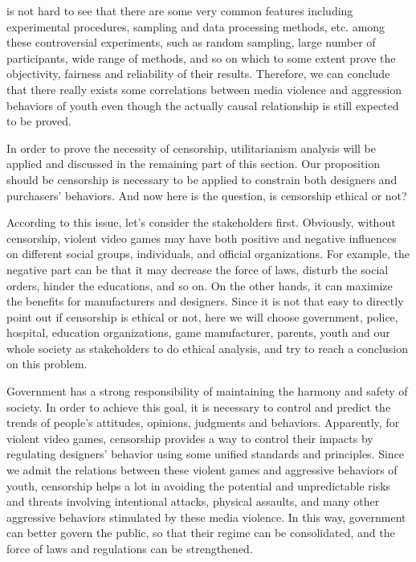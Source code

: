 is not hard to see that there are some very common features including experimental procedures, sampling and data processing methods, etc. among these controversial experiments, such as random sampling, large number of participants, wide range of methods, and so on which to some extent prove the objectivity, fairness and reliability of their results. Therefore, we can conclude that there really exists some correlations between media violence and aggression behaviors of youth even though the actually causal relationship is still expected to be proved. 

In order to prove the necessity of censorship, utilitarianism analysis will be applied and discussed in the remaining part of this section. Our proposition should be censorship is necessary to be applied to constrain both designers and purchasers' behaviors. And now here is the question, is censorship ethical or not? 

According to this issue, let's consider the stakeholders first. Obviously, without censorship, violent video games may have both positive and negative influences on different social groups, individuals, and official organizations. For example, the negative part can be that it may decrease the force of laws, disturb the social orders, hinder the educations, and so on. On the other hands, it can maximize the benefits for manufacturers and designers. Since it is not that easy to directly point out if censorship is ethical or not, here we will choose government, police, hospital, education organizations, game manufacturer, parents, youth and our whole society as stakeholders to do ethical analysis, and try to reach a conclusion on this problem.

Government has a strong responsibility of maintaining the harmony and safety of society. In order to achieve this goal, it is necessary to control and predict the trends of people's attitudes, opinions, judgments and behaviors. Apparently, for violent video games, censorship provides a way to control their impacts by regulating designers' behavior using some unified standards and principles. Since we admit the relations between these violent games and aggressive behaviors of youth, censorship helps a lot in avoiding the potential and unpredictable risks and threats involving intentional attacks, physical assaults, and many other aggressive behaviors stimulated by these media violence. In this way, government can better govern the public, so that their regime can be consolidated, and the force of laws and regulations can be strengthened.

